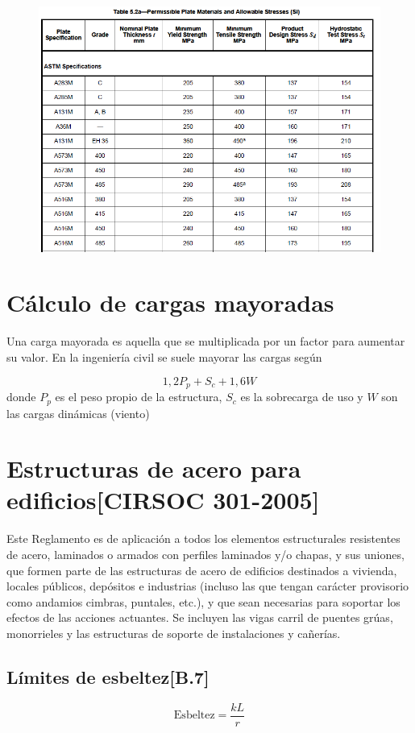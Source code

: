 \documentclass[twocolumn]{article}
\begin{document}
\begin{figure}[htb!]
	\centering
	\includegraphics[width=1\linewidth]{fig/api650materiales}
	\label{fig:api650materiales}
\end{figure}

\section{Cálculo de cargas mayoradas}
Una carga mayorada es aquella que se multiplicada por un factor para aumentar su valor. En la ingeniería civil se suele mayorar las cargas según

\[
1,2 P_p + S_c + 1,6W
\]
donde $P_p$ es el peso propio de la estructura, $S_c$ es la sobrecarga de uso y $W$ son las cargas dinámicas (viento)

\section{Estructuras de acero para edificios[CIRSOC 301-2005]}
Este Reglamento es de aplicación a todos los elementos estructurales resistentes de
acero, laminados o armados con perfiles laminados y/o chapas, y sus uniones, que
formen parte de las estructuras de acero de edificios destinados a vivienda, locales
públicos, depósitos e industrias (incluso las que tengan carácter provisorio como
andamios cimbras, puntales, etc.), y que sean necesarias para soportar los efectos de
las acciones actuantes. Se incluyen las vigas carril de puentes grúas, monorrieles y las
estructuras de soporte de instalaciones y cañerías.

\subsection{Límites de esbeltez[B.7]}
\[
\text{Esbeltez} = \frac{kL}{r}
\]
\end{document}
